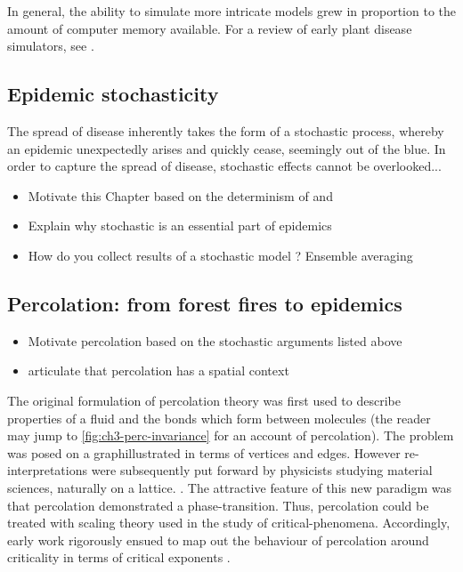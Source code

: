 In general, the ability to simulate more intricate models grew in proportion to the amount of computer memory available.
For a review of early plant disease simulators, see \cite{doi:10.1146/annurev.py.23.090185.002031}.

\subsection{Epidemic stochasticity}

The spread of disease inherently takes the form of a stochastic process, whereby an epidemic unexpectedly arises and quickly cease, seemingly out of the blue. In order to capture the spread of disease, stochastic effects cannot be overlooked... 

\begin{itemize}
    \item Motivate this Chapter based on the determinism of \cite{kermack-model} and \cite{van1999pandemics}
    \item Explain why stochastic is an essential part of epidemics
    \item How do you collect results of a stochastic model ? Ensemble averaging
\end{itemize}

\subsection{Percolation: from forest fires to epidemics}
\label{section:lit-rev-perc}

\begin{itemize}
    \item Motivate percolation based on the stochastic arguments listed above 
    \item articulate that percolation has a spatial context 
\end{itemize}

The original formulation of percolation theory was first used to describe properties of a fluid and the bonds which form between molecules \cite{perco_origin} (the reader may jump to \ref{fig:ch3-perc-invariance} for an account of percolation). The problem was posed on a graph\textemdash illustrated in terms of vertices and edges. However re-interpretations were subsequently put forward by physicists studying material sciences, naturally on a lattice. \cite{Essam_1980}. The attractive feature of this new paradigm was that percolation demonstrated a phase-transition. Thus, percolation could be treated with scaling theory used in the study of critical-phenomena. Accordingly, early work rigorously ensued to map out the behaviour of percolation around criticality in terms of critical exponents \cite{STAUFFER19791}. 

